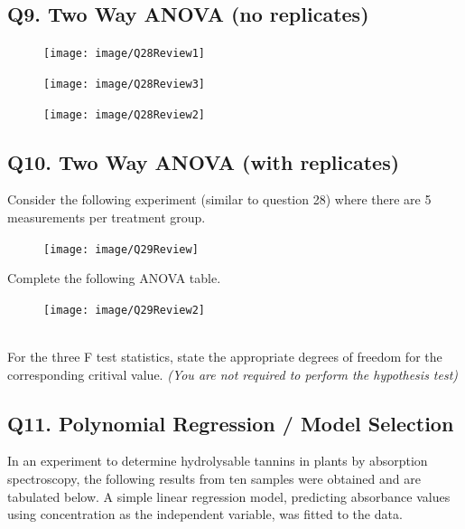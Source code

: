 \documentclass[a4paper,12pt]{article}
\begin{document}
\subsection*{Q9. Two Way ANOVA (no replicates)}
\begin{figure}[h!]
	\centering
	\texttt{[image: image/Q28Review1]}
	
\end{figure}
\begin{figure}[h!]
	\centering
	\texttt{[image: image/Q28Review3]}
	
\end{figure}
\begin{figure}[h!]
	\centering
	\texttt{[image: image/Q28Review2]}
	
\end{figure}
\newpage
\subsection*{Q10. Two Way ANOVA (with replicates)}

Consider the following experiment (similar to question 28) where there are 5 measurements per treatment group.
\begin{figure}[h!]
	\centering
	\texttt{[image: image/Q29Review]}
\end{figure}
Complete the following ANOVA table.\\ \bigskip
\begin{figure}[h!]
	\centering
	\texttt{[image: image/Q29Review2]}
\end{figure}\\


For the three F test statistics, state the appropriate degrees of freedom for the corresponding critival value. \textit{(You are not required to perform the hypothesis test)}
\newpage
\subsection*{Q11. Polynomial Regression / Model Selection}

In an experiment to determine hydrolysable tannins in plants by absorption spectroscopy, the following results from ten samples were obtained and are tabulated below. A simple linear regression model, predicting absorbance values using concentration as the independent variable, was fitted to the data.


\end{document}
